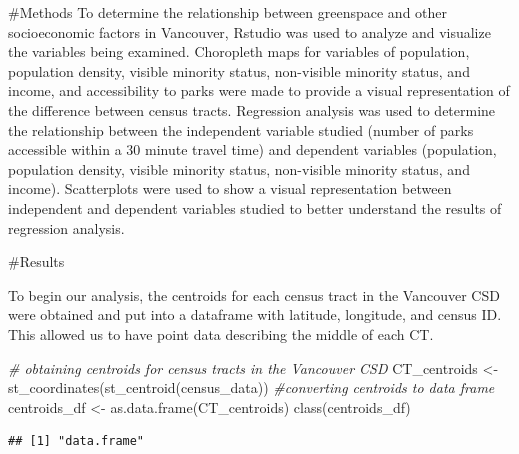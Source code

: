 \documentclass[
]{article}
\newenvironment{Shaded}{\begin{snugshade}}{\end{snugshade}}
\newcommand{\CommentTok}[1]{\textcolor[rgb]{0.56,0.35,0.01}{\textit{#1}}}
\newcommand{\FunctionTok}[1]{\textcolor[rgb]{0.00,0.00,0.00}{#1}}
\newcommand{\NormalTok}[1]{#1}
\newcommand{\OtherTok}[1]{\textcolor[rgb]{0.56,0.35,0.01}{#1}}
\newcommand{\SpecialCharTok}[1]{\textcolor[rgb]{0.00,0.00,0.00}{#1}}
\newcommand{\StringTok}[1]{\textcolor[rgb]{0.31,0.60,0.02}{#1}}
\begin{document}
\#Methods To determine the relationship between greenspace and other
socioeconomic factors in Vancouver, Rstudio was used to analyze and
visualize the variables being examined. Choropleth maps for variables of
population, population density, visible minority status, non-visible
minority status, and income, and accessibility to parks were made to
provide a visual representation of the difference between census tracts.
Regression analysis was used to determine the relationship between the
independent variable studied (number of parks accessible within a 30
minute travel time) and dependent variables (population, population
density, visible minority status, non-visible minority status, and
income). Scatterplots were used to show a visual representation between
independent and dependent variables studied to better understand the
results of regression analysis.

\#Results

To begin our analysis, the centroids for each census tract in the
Vancouver CSD were obtained and put into a dataframe with latitude,
longitude, and census ID. This allowed us to have point data describing
the middle of each CT.

\begin{Shaded}
\begin{Highlighting}[]
\CommentTok{\# obtaining centroids for census tracts in the Vancouver CSD }
\NormalTok{CT\_centroids }\OtherTok{\textless{}{-}} \FunctionTok{st\_coordinates}\NormalTok{(}\FunctionTok{st\_centroid}\NormalTok{(census\_data))}
\CommentTok{\#converting centroids to data frame}
\NormalTok{centroids\_df }\OtherTok{\textless{}{-}} \FunctionTok{as.data.frame}\NormalTok{(CT\_centroids)}
\FunctionTok{class}\NormalTok{(centroids\_df)}
\end{Highlighting}
\end{Shaded}

\begin{verbatim}
## [1] "data.frame"
\end{verbatim}

\begin{Shaded}
\end{Shaded}
\end{document}
